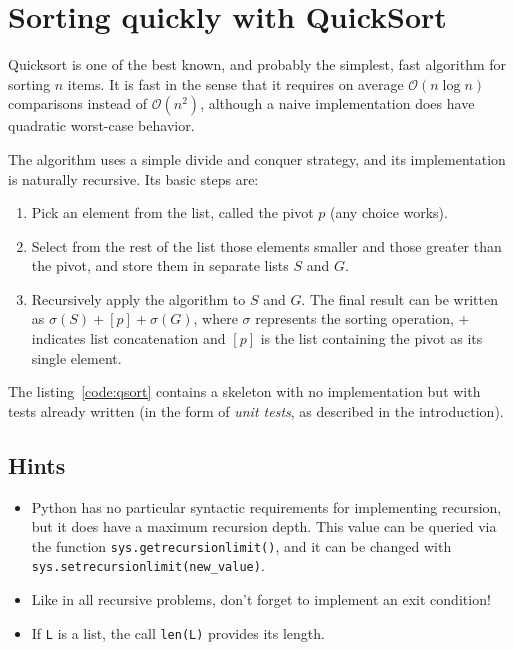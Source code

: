 
\section{Sorting quickly with QuickSort }

Quicksort is one of the best known, and probably the simplest, fast
algorithm for sorting $n$ items. It is fast in the sense that it
requires on average $\mathcal{O}(n\log n)$ comparisons instead of
$\mathcal{O}(n^{2})$, although a naive implementation does have quadratic
worst-case behavior.

The algorithm uses a simple divide and conquer strategy, and its implementation
is naturally recursive. Its basic steps are:

\begin{enumerate}
\item Pick an element from the list, called the pivot $p$ (any choice works).
\item Select from the rest of the list those elements smaller and those
greater than the pivot, and store them in separate lists $S$ and
$G$.
\item Recursively apply the algorithm \texttt{}to $S$ and $G$. The final
result can be written as $\sigma(S)+[p]+\sigma(G)$, where $\sigma$
represents the sorting operation, $+$ indicates list concatenation
and $[p]$ is the list containing the pivot as its single element.
\end{enumerate}
The listing~\ref{code:qsort} contains a skeleton with no implementation
but with tests already written (in the form of \emph{unit tests},
as described in the introduction).




\subsection*{Hints}

\begin{itemize}

\item Python has no particular syntactic requirements for implementing
  recursion, but it does have a maximum recursion depth. This value can be
  queried via the function \texttt{sys.getrecursionlimit()}, and it can be
  changed with \texttt{sys.setrecursionlimit(new\_value)}.

\item Like in all recursive problems, don't forget to implement an exit
  condition!

\item If \texttt{L} is a list, the call \texttt{len(L)} provides its length.

\end{itemize}

